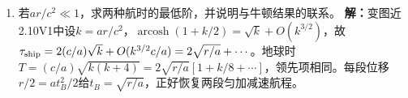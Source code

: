 \documentclass[UTF8,fontset=fandol,a4paper,11pt]{ctexart}
\begin{document}
\begin{enumerate}
\item 若$ar/c^2\ll1$，求两种航时的最低阶，并说明与牛顿结果的联系。
\textbf{解：}变图近2.10V1中设$k=ar/c^2$，$\operatorname{arcosh}(1+k/2)=\sqrt k+O(k^{3/2})$，故$\tau_{\rm ship}=2(c/a)\sqrt k+O(k^{3/2}c/a)=2\sqrt{r/a}+\cdots$。地球时$T=(c/a)\sqrt{k(k+4)}=2\sqrt{r/a}[1+k/8+\cdots]$，领先项相同。每段位移$r/2=at_B^2/2$给$t_B=\sqrt{r/a}$，正好恢复两段匀加减速航程。
\begin{center}\begin{minipage}{.98\linewidth}\centering
{}
\end{minipage}
\end{center}
\end{enumerate}
\end{document}

